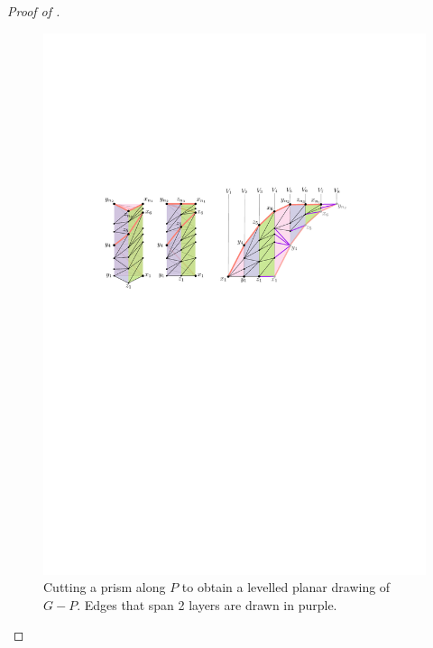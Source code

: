 \documentclass{patmorin}
\begin{document}
\begin{proof}[Proof of ]
  \begin{figure}
   \begin{center}
      \includegraphics[width=0.95\columnwidth]{figs/prism}
   \end{center}
   \caption{Cutting a prism along $P$ to obtain a levelled planar
    drawing of $G-P$. Edges that span 2 layers are drawn in purple.}
  \end{figure}


\end{proof}
\end{document}
